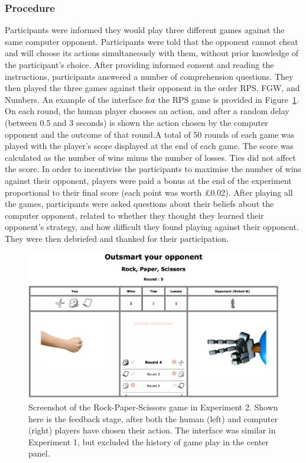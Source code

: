 \documentclass[man,floatsintext]{apa6}
\begin{document}
\hypertarget{procedure}{%
\subsubsection{Procedure}\label{procedure}}

Participants were informed they would play three different games against the same computer opponent. Participants were told that the opponent cannot cheat and will choose its actions simultaneously with them, without prior knowledge of the participant's choice. After providing informed consent and reading the instructions, participants answered a number of comprehension questions. They then played the three games against their opponent in the order RPS, FGW, and Numbers. An example of the interface for the RPS game is provided in Figure~\ref{fig:feedback-rps-exp2}. On each round, the human player chooses an action, and after a random delay (between 0.5 and 3 seconds) is shown the action chosen by the computer opponent and the outcome of that round.A total of 50 rounds of each game was played with the player's score displayed at the end of each game. The score was calculated as the number of wins minus the number of losses. Ties did not affect the score. In order to incentivise the participants to maximise the number of wins against their opponent, players were paid a bonus at the end of the experiment proportional to their final score (each point was worth £0.02). After playing all the games, participants were asked questions about their beliefs about the computer opponent, related to whether they thought they learned their opponent's strategy, and how difficult they found playing against their opponent. They were then debriefed and thanked for their participation.

\begin{figure}

{\centering \includegraphics{images/feedback_rps} 

}

\caption{Screenshot of the Rock-Paper-Scissors game in Experiment 2. Shown here is the feedback stage, after both the human (left) and computer (right) players have chosen their action. The interface was similar in Experiment 1, but excluded the history of game play in the center panel.}\label{fig:feedback-rps-exp2}
\end{figure}
\end{document}
